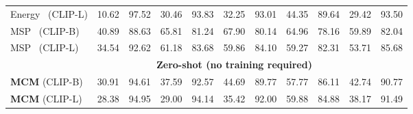 \documentclass{article}
\begin{document}
\begin{table}[t]
{\begin{tabular}{lcccccccccc}
Energy~\cite{liu2020energy} (CLIP-L) & 10.62&	97.52 &30.46&	93.83 &32.25&	93.01& 44.35&	89.64& 29.42&	93.50\\
MSP~\cite{hendrycks2016baseline} (CLIP-B)&40.89&	88.63&	65.81&	81.24&	67.90&	80.14&	64.96&	78.16&	59.89&	82.04\\
MSP~\cite{hendrycks2016baseline} (CLIP-L)&34.54&	92.62&	61.18&	83.68&	59.86&	84.10&	59.27&	82.31&	53.71&	85.68\\
\midrule
 &\multicolumn{9}{c}{\textbf{Zero-shot (no training required)}}   \\
\textbf{MCM} (CLIP-B) 
& 30.91	& 94.61	& 37.59& 	92.57& 	44.69& 	89.77& 	57.77& 	86.11& 	42.74& 	90.77\\
\textbf{MCM} (CLIP-L) 
&28.38&	94.95&	29.00&	94.14&	35.42&	92.00&	59.88&	84.88&38.17&	91.49\\
\bottomrule
\end{tabular}
}
\end{table}
\end{document}

